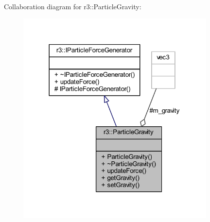 Collaboration diagram for r3\+:\+:Particle\+Gravity\+:\nopagebreak
\begin{figure}[H]
\begin{center}
\leavevmode
\includegraphics[width=282pt]{classr3_1_1_particle_gravity__coll__graph}
\end{center}
\end{figure}
